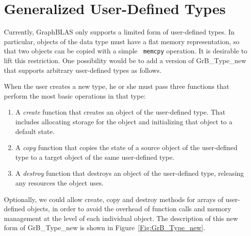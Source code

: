 \section{Generalized User-Defined Types}
\label{Sec:UsrTypes}

Currently, GraphBLAS only supports a limited form of user-defined
types. In particular, objects of the data type must have a flat memory
representation, so that two objects can be copied with a simple {\tt
memcpy} operation.  It is desirable to lift this restriction. One
possibility would be to add a version of {\sf GrB\_Type\_new} that
supports arbitrary user-defined types as follows.

When the user creates a new type, he or she must pass three functions
that perform the most basic operations in that type:
\begin{enumerate}
	\item A \emph{create} function that creates an object of the
	user-defined type. That includes allocating storage for the
	object and initializing that object to a default state.

	\item A \emph{copy} function that copies the state of a source
	object of the user-defined type to a target object of the same
	user-defined type.

	\item A \emph{destroy} function that destroys an object of the
	user-defined type, releasing any resources the object uses.
\end{enumerate}
Optionally, we could allow create, copy and destroy methods for arrays
of user-defined objects, in order to avoid the overhead of function
calls and memory management at the level of each individual object.
The description of this new form of {\sf GrB\_Type\_new} is shown
in Figure~\ref{Fig:GrB_Type_new}.

